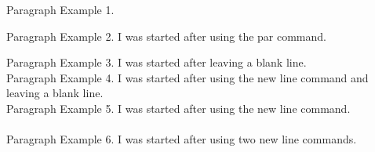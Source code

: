\documentclass[10pt,a4paper]{article}
\begin{document}
Paragraph Example 1. \par
Paragraph Example 2. I was started after using the par command. 

Paragraph Example 3. I was started after leaving a blank line. \\

Paragraph Example 4. I was started after using the new line command and leaving a blank line. \\
Paragraph Example 5. I was started after using the new line command. \\\\
Paragraph Example 6. I was started after using two new line commands. 
\end{document}
